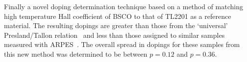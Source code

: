 Finally a novel doping determination technique based on a method of matching high temperature Hall coefficient of \ac{BSCO} to that of \ac{TL2201} as a reference material. The resulting dopings are greater than those from the `universal' Presland/Tallon relation~\cite{Presland1991} and less than those assigned to similar samples measured with \ac{ARPES}~\cite{Kondo2004}. The overall spread in dopings for these samples from this new method was determined to be between $p=0.12$ and $p=0.36$.

